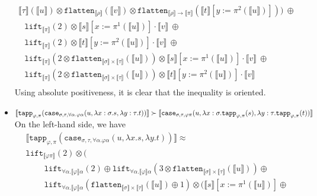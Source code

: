 \documentclass[a4paper,UKenglish,cleveref,autoref,numberwithinsect]{lipics-v2019}
\theoremstyle{definition}
\newcommand{\arrtype}{\rightarrow}
\newcommand{\quant}[2]{\forall #1.#2}
\newcommand{\abs}[2]{\lambda #1.#2}
\newcommand{\flatten}{\mathtt{flatten}}
\newcommand{\lift}{\mathtt{lift}}
\newcommand{\typeinterpret}[1]{\llbracket #1 \rrbracket}
\newcommand{\interpret}[1]{\llbracket #1 \rrbracket}
\begin{document}
\begin{itemize}
\[\begin{array}{l}
{    \typeinterpret{\tau}}(\interpret{u}) \otimes
    \flatten_{\typeinterpret{\rho}}(\interpret{v}) \otimes
    \flatten_{\typeinterpret{\rho} \arrtype \typeinterpret{\pi}}(
    \interpret{t}[y:=\pi^2(\interpret{u})]))\ \oplus \\
  \phantom{A}
  \lift_{\typeinterpret{\pi}}(2) \otimes \interpret{s}[x:=\pi^1(
    \interpret{u})] \cdot \interpret{v}\ \oplus \\
  \phantom{A}
  \lift_{\typeinterpret{\pi}}(2) \otimes \interpret{t}[y:=\pi^2(
    \interpret{u})] \cdot \interpret{v}\ \oplus \\
  \phantom{A}
  \lift_{\typeinterpret{\pi}}(2 \otimes
    \flatten_{\typeinterpret{\sigma} \times
    \typeinterpret{\tau}}(\interpret{u})) \otimes
    \interpret{s}[x:=\pi^1(\interpret{u})] \cdot \interpret{v}\ \oplus\\
  \phantom{A}
  \lift_{\typeinterpret{\pi}}(2 \otimes
    \flatten_{\typeinterpret{\sigma} \times
    \typeinterpret{\tau}}(\interpret{u})) \otimes
    \interpret{t}[y:=\pi^2(\interpret{u})] \cdot \interpret{v} \\
  \end{array}
  \]
  Using absolute positiveness, it is clear that the inequality is
  oriented.
\item $\interpret{\mathtt{tapp}_{\varphi,\pi}(\mathtt{case}_{\sigma,\tau,
  \quant{\alpha}{\varphi\alpha}}(u,\abs{x:\sigma}{s},\abs{y:\tau}{t}))}
  \succ \\ \interpret{\mathtt{case}_{\sigma,\tau,\varphi\pi}(u,
  \abs{x:\sigma}{\mathtt{tapp}_{\varphi,\pi}(s)},
  \abs{y:\tau}{\mathtt{tapp}_{\varphi,\pi}(t)})}$ \\
  On the left-hand side, we have
  \[
  \begin{array}{l}
  \interpret{\mathtt{tapp}_{\varphi,\pi}(\mathtt{case}_{\sigma,\tau,
  \quant{\alpha}{\varphi\alpha}}(u,\abs{x}{s},\abs{y}{t}))} \approx \\
  \lift_{\typeinterpret{\varphi\pi}}(2) \otimes ( \\
    \phantom{ABC}
    \lift_{\quant{\alpha}{\typeinterpret{\varphi}\alpha}}(2) \oplus
    \lift_{\quant{\alpha}{\typeinterpret{\varphi}\alpha}}(3 \otimes
      \flatten_{\typeinterpret{\sigma} \times \typeinterpret{\tau}}(
      \interpret{u})) \oplus \\
    \phantom{ABC}
    \lift_{\quant{\alpha}{\typeinterpret{\varphi}\alpha}}(
      \flatten_{\typeinterpret{\sigma} \times \typeinterpret{\tau}}(
      \interpret{u}) \oplus 1) \otimes (
      \interpret{s}[x:=\pi^1(\interpret{u})] \oplus

\end{array}\]
\end{itemize}
\end{document}
